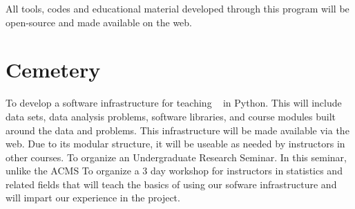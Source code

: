 All tools, codes and educational material developed through this
program will be open-source and made available on the web. 

\section{Cemetery}

To develop a software infrastructure for teaching \cdse~ in
  Python. This will include data sets, data analysis problems,
  software libraries, and course modules built around the data and
  problems. This infrastructure will be made available via the
  web. Due to its modular structure, it will be useable as needed by
  instructors in other courses.
 To organize an Undergraduate Research Seminar. In this seminar, unlike the ACMS 
 To organize a 3 day workshop for instructors in statistics and related fields that will teach the basics of using our sofware infrastructure and will impart our experience in the project.



